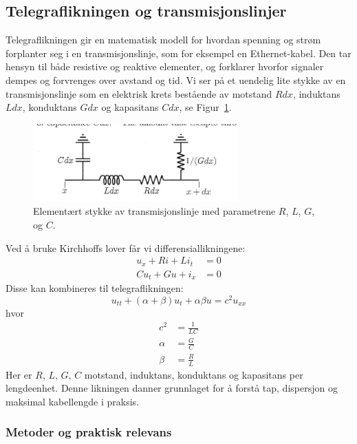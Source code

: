\clearpage
\subsection{Telegraflikningen og transmisjonslinjer}

Telegraflikningen gir en matematisk modell for hvordan spenning og strøm forplanter seg i en transmisjonslinje, som for eksempel en Ethernet-kabel. Den tar hensyn til både resistive og reaktive elementer, og forklarer hvorfor signaler dempes og forvrenges over avstand og tid.
Vi ser på et uendelig lite stykke av en transmisjonslinje som en elektrisk krets bestående av motstand $R dx$, induktans $L dx$, konduktans $G dx$ og kapasitans $C dx$, se Figur~\ref{fig:telegraflinje}.

\begin{figure}[h]
    \centering
    \includegraphics[width=0.7\textwidth]{Media/telegraflinje.png}
    \caption{Elementært stykke av transmisjonslinje med parametrene $R$, $L$, $G$, og $C$.}
    \label{fig:telegraflinje}
\end{figure}

\noindent Ved å bruke Kirchhoffs lover får vi differensiallikningene:
\begin{align}
u_x + R i + L i_t &= 0 \\
C u_t + G u + i_x &= 0
\end{align}
Disse kan kombineres til telegraflikningen:
\begin{equation}
u_{tt} + (\alpha + \beta) u_t + \alpha \beta u = c^2 u_{xx}
\end{equation}
hvor
\begin{align*}
c^2 &= \frac{1}{LC} \\
\alpha &= \frac{G}{C} \\
\beta &= \frac{R}{L}
\end{align*}
Her er $R$, $L$, $G$, $C$ motstand, induktans, konduktans og kapasitans per lengdeenhet. Denne likningen danner grunnlaget for å forstå tap, dispersjon og maksimal kabellengde i praksis.

\subsubsection{Metoder og praktisk relevans}

